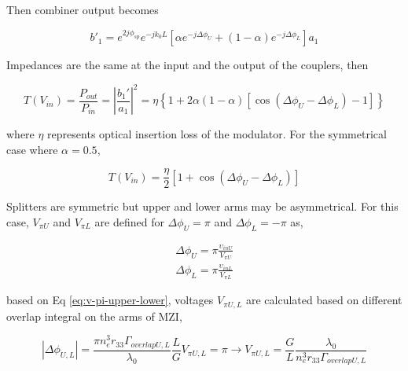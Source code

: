 \documentclass[thesis]{deutez}
\begin{document}
    Then combiner output becomes

    \begin{equation}
        b'_1 = e^{2j\phi_{sp}}e^{-jk_0L} \left[ \alpha e^{-j\Delta\phi_U} + (1-\alpha) e^{-j\Delta\phi_L} \right] a_1
    \end{equation}

    Impedances are the same at the input and the output of the couplers, then 

    \begin{equation}
        T(V_{in}) = \frac{P_{out}}{P_{in}} = \left| \frac{b_1'}{a_1} \right|^2 = \eta \left\{ 1 + 2\alpha(1 - \alpha)\left[ \cos(\Delta\phi_U - \Delta\phi_L) - 1 \right] \right\}
    \end{equation}

    where $\eta$ represents optical insertion loss of the modulator. For the symmetrical case where $\alpha=0.5$, 

    \begin{equation}
        T(V_{in}) = \frac{\eta}{2} \left[ 1+\cos(\Delta\phi_U - \Delta\phi_L) \right] 
        \label{eq:transmission-char-equal-splitter} 
    \end{equation}

    Splitters are symmetric but upper and lower arms may be asymmetrical. For this case, $V_{\pi U}$ and $V_{\pi L}$ are defined for $\Delta\phi_U = \pi$ and $\Delta\phi_L = -\pi$ as,

    \begin{subequations}\label{eq:v-pi-upper-lower}
        \begin{align}
            \Delta\phi_U = \pi \frac{\upsilon_{inU}}{V_{\pi U}} \label{eq:eq:v-pi-upper} \\
            \Delta\phi_L = \pi \frac{\upsilon_{inL}}{V_{\pi L}} \label{eq:v-pi-lower}
        \end{align}
    \end{subequations}

    based on Eq \ref{eq:v-pi-upper-lower}, voltages $V_{\pi U,L}$ are calculated based on different overlap integral on the arms of MZI,
     
    \begin{equation}
        |\Delta\phi_{U,L}| = \frac{\pi n_e^3 r_{33}\Gamma_{overlapU,L}}{\lambda_0}\frac{L}{G}V_{\pi U,L} = \pi \rightarrow V_{\pi U,L} = \frac{G}{L}\frac{\lambda_0}{n_e^3 r_{33}\Gamma_{overlapU,L}}
        \label{eq:asymmetric-v-pi}
    \end{equation}
\end{document}
